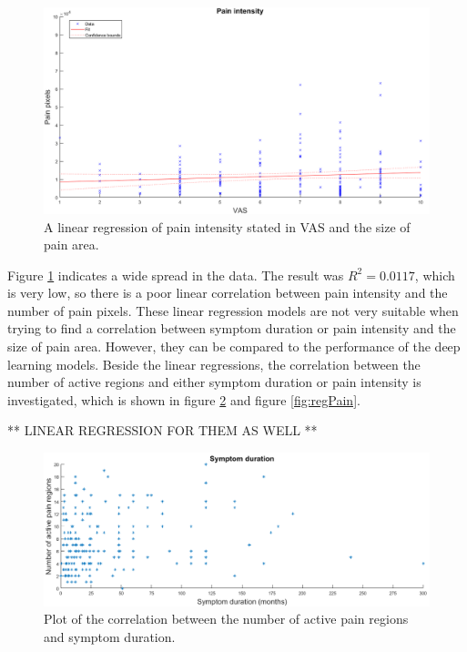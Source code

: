 \begin{figure} [H]
\centering
\includegraphics[width=1\textwidth]{figures/painRegression}
\caption{A linear regression of pain intensity stated in VAS and the size of pain area.}
\label{fig:painRegression}
\end{figure}

\noindent
Figure \ref{fig:painRegression} indicates a wide spread in the data. The result was $R^2=0.0117$, which is very low, so there is a poor linear correlation between pain intensity and the number of pain pixels.\newline
\noindent
These linear regression models are not very suitable when trying to find a correlation between symptom duration or pain intensity and the size of pain area. However, they can be compared to the performance of the deep learning models. 
\noindent
Beside the linear regressions, the correlation between the number of active regions and either symptom duration or pain intensity is investigated, which is shown in figure \ref{fig:regDuration} and figure \ref{fig:regPain}. \newline

** LINEAR REGRESSION FOR THEM AS WELL **

\begin{figure} [H]
\centering
\includegraphics[width=1\textwidth]{figures/regionRegressionDuration}
\caption{Plot of the correlation between the number of active pain regions and symptom duration.}
\label{fig:regDuration}
\end{figure}

